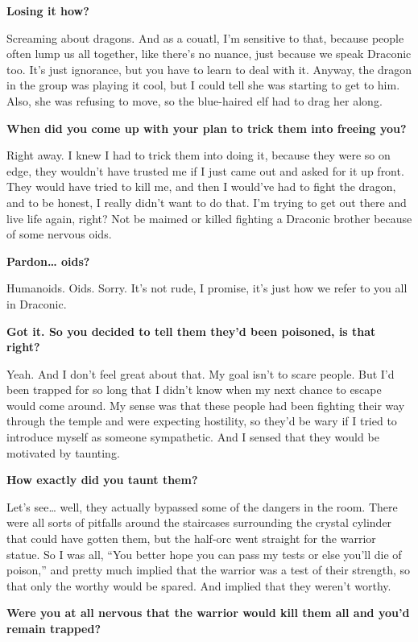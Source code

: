 \documentclass[smalldemyvopaper,11pt,twoside,onecolumn,openright,extrafontsizes]{memoir}
\begin{document}
\textbf{Losing it how?}

Screaming about dragons. And as a couatl, I'm sensitive to that, because
people often lump us all together, like there's no nuance, just because
we speak Draconic too. It's just ignorance, but you have to learn to
deal with it. Anyway, the dragon in the group was playing it cool, but I
could tell she was starting to get to him. Also, she was refusing to
move, so the blue-haired elf had to drag her along.

\textbf{When did you come up with your plan to trick them into freeing
you?}

Right away. I knew I had to trick them into doing it, because they were
so on edge, they wouldn't have trusted me if I just came out and asked
for it up front. They would have tried to kill me, and then I would've
had to fight the dragon, and to be honest, I really didn't want to do
that. I'm trying to get out there and live life again, right? Not be
maimed or killed fighting a Draconic brother because of some nervous
oids.

\textbf{Pardon\ldots{} oids?}

Humanoids. Oids. Sorry. It's not rude, I promise, it's just how we refer
to you all in Draconic.

\textbf{Got it. So you decided to tell them they'd been poisoned, is
that right?}

Yeah. And I don't feel great about that. My goal isn't to scare people.
But I'd been trapped for so long that I didn't know when my next chance
to escape would come around. My sense was that these people had been
fighting their way through the temple and were expecting hostility, so
they'd be wary if I tried to introduce myself as someone sympathetic.
And I sensed that they would be motivated by taunting.

\textbf{How exactly did you taunt them?}

Let's see\ldots{} well, they actually bypassed some of the dangers in
the room. There were all sorts of pitfalls around the staircases
surrounding the crystal cylinder that could have gotten them, but the
half-orc went straight for the warrior statue. So I was all, ``You
better hope you can pass my tests or else you'll die of poison,'' and
pretty much implied that the warrior was a test of their strength, so
that only the worthy would be spared. And implied that they weren't
worthy.

\textbf{Were you at all nervous that the warrior would kill them all and
you'd remain trapped?}
\end{document}
